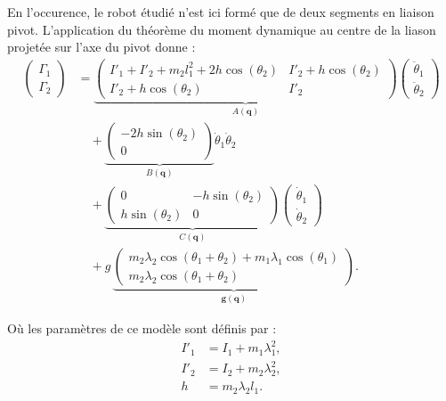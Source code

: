 \documentclass[10pt,a4paper,twocolumn]{article}
\begin{document}
En l'occurence, le robot étudié n'est ici formé que de deux segments en liaison pivot.
L'application du théorème du moment dynamique au centre de la liason projetée sur l'axe
du pivot donne : 
\begin{equation}
  \begin{aligned}
    \begin{pmatrix}
      \Gamma_1 \\
      \Gamma_2
    \end{pmatrix}
    &=
    \underbrace{
      \begin{pmatrix}
        I'_1 + I'_2 + m_2l_1^2 + 2h\cos(\theta_2) & I'_2 + h\cos(\theta_2) \\
        I'_2 + h\cos(\theta_2) & I'_2
      \end{pmatrix}
    }_{A(\mathbf{q})}
    \begin{pmatrix}
      \ddot{\theta}_1 \\
      \ddot{\theta}_2
    \end{pmatrix}
    \\[0.5em]
    &\quad+
    \underbrace{
      \begin{pmatrix}
        -2h\sin(\theta_2) \\
        0
      \end{pmatrix}
    }_{B(\mathbf{q})}
    \dot{\theta}_1\dot{\theta}_2
    \\[0.5em]
    &\quad+
    \underbrace{
      \begin{pmatrix}
        0 & -h\sin(\theta_2) \\
        h\sin(\theta_2) & 0
      \end{pmatrix}
    }_{C(\mathbf{q})}
    \begin{pmatrix}
      \dot{\theta}_1 \\
      \dot{\theta}_2
    \end{pmatrix}
    \\[0.5em]
    &\quad+
    g\,
    \underbrace{
      \begin{pmatrix}
        m_2\lambda_2\cos(\theta_1+\theta_2) + m_1\lambda_1\cos(\theta_1) \\
        m_2\lambda_2\cos(\theta_1+\theta_2)
      \end{pmatrix}
    }_{\mathbf{g}(\mathbf{q})}.
  \end{aligned}
\label{eq:modele_relatif}
\end{equation}

Où les paramètres de ce modèle sont définis par :
\begin{equation}
  \begin{aligned}
    I'_1 &= I_1 + m_1\lambda_1^2,\\
    I'_2 &= I_2 + m_2\lambda_2^2,\\
    h &= m_2\lambda_2l_1.
  \end{aligned}
\label{eq:parametres_relatifs}
\end{equation}
\end{document}
